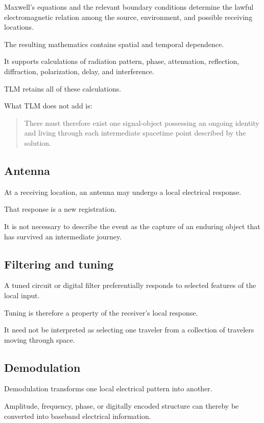 \documentclass[12pt,onecolumn]{article}
\begin{document}
Maxwell's equations and the relevant boundary conditions determine the
lawful electromagnetic relation among the source, environment, and
possible receiving locations.

The resulting mathematics contains spatial and temporal dependence.

It supports calculations of radiation pattern, phase, attenuation,
reflection, diffraction, polarization, delay, and interference.

TLM retains all of these calculations.

What TLM does not add is:

\begin{quote}
There must therefore exist one signal-object possessing an ongoing
identity and living through each intermediate spacetime point described
by the solution.
\end{quote}

\subsection*{Antenna}

At a receiving location, an antenna may undergo a local electrical
response.

That response is a new registration.

It is not necessary to describe the event as the capture of an enduring
object that has survived an intermediate journey.

\subsection*{Filtering and tuning}

A tuned circuit or digital filter preferentially responds to selected
features of the local input.

Tuning is therefore a property of the receiver's local response.

It need not be interpreted as selecting one traveler from a collection
of travelers moving through space.

\subsection*{Demodulation}

Demodulation transforms one local electrical pattern into another.

Amplitude, frequency, phase, or digitally encoded structure can thereby
be converted into baseband electrical information.
\end{document}
